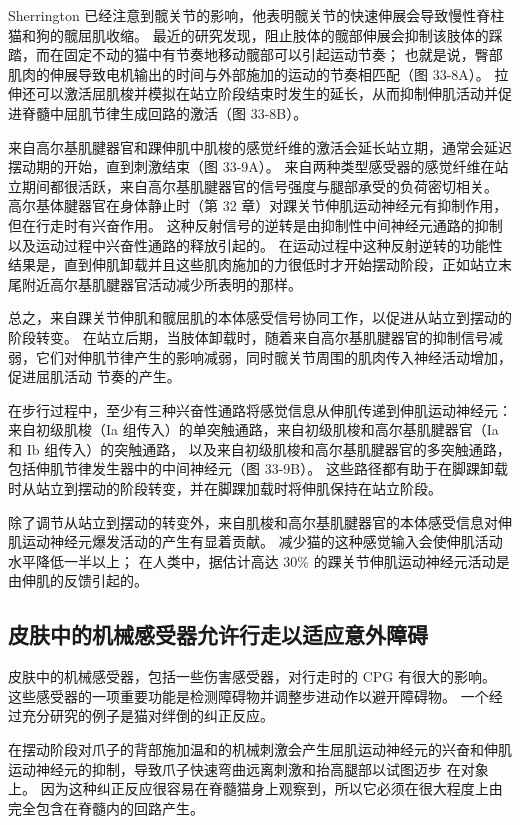 Sherrington 已经注意到髋关节的影响，他表明髋关节的快速伸展会导致慢性脊柱猫和狗的髋屈肌收缩。 最近的研究发现，阻止肢体的髋部伸展会抑制该肢体的踩踏，而在固定不动的猫中有节奏地移动髋部可以引起运动节奏； 也就是说，臀部肌肉的伸展导致电机输出的时间与外部施加的运动的节奏相匹配（图 33-8A）。 拉伸还可以激活屈肌梭并模拟在站立阶段结束时发生的延长，从而抑制伸肌活动并促进脊髓中屈肌节律生成回路的激活（图 33-8B）。

来自高尔基肌腱器官和踝伸肌中肌梭的感觉纤维的激活会延长站立期，通常会延迟摆动期的开始，直到刺激结束（图 33-9A）。 来自两种类型感受器的感觉纤维在站立期间都很活跃，来自高尔基肌腱器官的信号强度与腿部承受的负荷密切相关。 高尔基体腱器官在身体静止时（第 32 章）对踝关节伸肌运动神经元有抑制作用，但在行走时有兴奋作用。 这种反射信号的逆转是由抑制性中间神经元通路的抑制以及运动过程中兴奋性通路的释放引起的。 在运动过程中这种反射逆转的功能性结果是，直到伸肌卸载并且这些肌肉施加的力很低时才开始摆动阶段，正如站立末尾附近高尔基肌腱器官活动减少所表明的那样。

总之，来自踝关节伸肌和髋屈肌的本体感受信号协同工作，以促进从站立到摆动的阶段转变。 在站立后期，当肢体卸载时，随着来自高尔基肌腱器官的抑制信号减弱，它们对伸肌节律产生的影响减弱，同时髋关节周围的肌肉传入神经活动增加，促进屈肌活动 节奏的产生。

在步行过程中，至少有三种兴奋性通路将感觉信息从伸肌传递到伸肌运动神经元：来自初级肌梭（Ia 组传入）的单突触通路，来自初级肌梭和高尔基肌腱器官（Ia 和 Ib 组传入）的突触通路， 以及来自初级肌梭和高尔基肌腱器官的多突触通路，包括伸肌节律发生器中的中间神经元（图 33-9B）。 这些路径都有助于在脚踝卸载时从站立到摆动的阶段转变，并在脚踝加载时将伸肌保持在站立阶段。

除了调节从站立到摆动的转变外，来自肌梭和高尔基肌腱器官的本体感受信息对伸肌运动神经元爆发活动的产生有显着贡献。 减少猫的这种感觉输入会使伸肌活动水平降低一半以上； 在人类中，据估计高达 30\% 的踝关节伸肌运动神经元活动是由伸肌的反馈引起的。

\subsection{皮肤中的机械感受器允许行走以适应意外障碍}
皮肤中的机械感受器，包括一些伤害感受器，对行走时的 CPG 有很大的影响。 这些感受器的一项重要功能是检测障碍物并调整步进动作以避开障碍物。 一个经过充分研究的例子是猫对绊倒的纠正反应。

在摆动阶段对爪子的背部施加温和的机械刺激会产生屈肌运动神经元的兴奋和伸肌运动神经元的抑制，导致爪子快速弯曲远离刺激和抬高腿部以试图迈步 在对象上。 因为这种纠正反应很容易在脊髓猫身上观察到，所以它必须在很大程度上由完全包含在脊髓内的回路产生。

